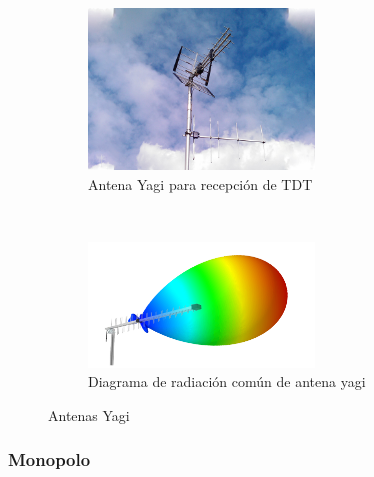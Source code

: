\begin{figure}[h]
\centering
	\begin{subfigure}[b]{0.4\textwidth}
    \centering
        \includegraphics[width=6cm]{archivos/dipolo/yagi}
        \caption{Antena Yagi para recepción de TDT \citep{Pearce2010}}
        \label{fig:yagi}
	\end{subfigure}
~ %
	\begin{subfigure}[b]{0.5\textwidth} %
	\centering
		\includegraphics[width=6cm]{archivos/yagipat} %
		\caption{Diagrama de radiación común de antena yagi}
		\label{fig:yagirad}
	\end{subfigure}
\caption{Antenas Yagi}\label{fig:yagis}
\end{figure}

\subsubsection{Monopolo}

